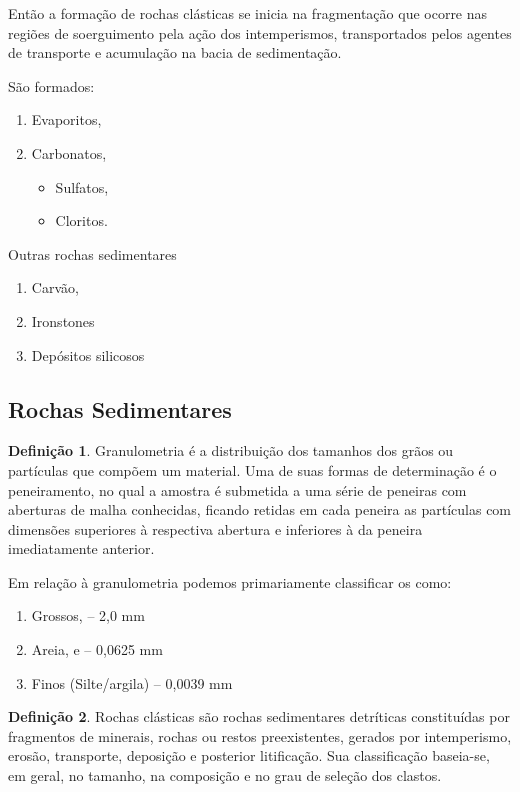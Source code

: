 \documentclass[a4paper,12pt]{article}
\theoremstyle{definition}
\theoremstyle{definition}
\theoremstyle{definition}
\newtheorem{definicao}{Definição}[section]
\begin{document}
Então a formação de rochas clásticas se inicia na fragmentação que ocorre nas regiões de soerguimento pela ação dos intemperismos, transportados pelos agentes de transporte e acumulação na bacia de sedimentação.

São formados:

\begin{enumerate}[label=\alph*.]
    \item Evaporitos,
    \item Carbonatos,
        \begin{itemize}
            \item Sulfatos,
            \item Cloritos.
        \end{itemize}
\end{enumerate}

Outras rochas sedimentares
\begin{enumerate}[label=\alph*.]
    \item Carvão,
    \item Ironstones
    \item Depósitos silicosos
\end{enumerate}

\subsection{Rochas Sedimentares}

\begin{definicao}
    
Granulometria é a distribuição dos tamanhos dos grãos ou partículas que compõem um material. Uma de suas formas de determinação é o peneiramento, no qual a amostra é submetida a uma série de peneiras com aberturas de malha conhecidas, ficando retidas em cada peneira as partículas com dimensões superiores à respectiva abertura e inferiores à da peneira imediatamente anterior.
    \end{definicao}
Em relação à granulometria podemos primariamente classificar os como:
\begin{enumerate}
    \item Grossos,
    -- 2,0 mm
    \item Areia, e
    -- 0,0625 mm
    \item Finos (Silte/argila)
    -- 0,0039 mm
\end{enumerate}

\begin{definicao}
Rochas clásticas são rochas sedimentares detríticas constituídas por fragmentos de minerais, rochas ou restos preexistentes, gerados por intemperismo, erosão, transporte, deposição e posterior litificação. Sua classificação baseia-se, em geral, no tamanho, na composição e no grau de seleção dos clastos.
\end{definicao}
\end{document}

